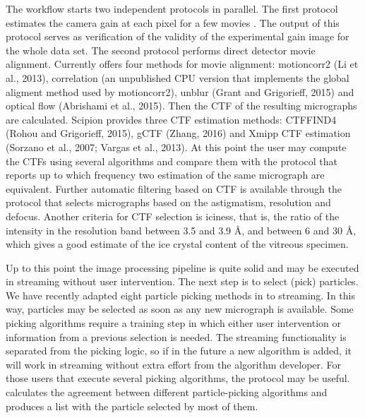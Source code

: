 The workflow starts two independent protocols in parallel. The first protocol estimates the camera gain at each pixel for a few  movies \citep{sorzano2018}. %
The output of this protocol serves as verification of the validity of the experimental gain image for the whole data set. The second protocol performs direct detector movie alignment. Currently \scipion offers  four  methods for movie alignment: motioncorr2 (Li et al., 2013), correlation (an unpublished CPU version that implements the global aligment method used by motioncorr2), unblur (Grant and Grigorieff, 2015) and optical flow (Abrishami et al., 2015). Then the CTF of the resulting micrographs are calculated. Scipion provides three CTF estimation methods:
CTFFIND4 (Rohou and Grigorieff, 2015), gCTF (Zhang, 2016) and Xmipp CTF estimation (Sorzano et al., 2007; Vargas et al., 2013). At this point the user may compute the CTFs using several algorithms and compare them with the protocol  that reports up to which frequency two estimation of the same micrograph are equivalent. Further automatic filtering based on CTF is available through the protocol  that selects micrographs based on the astigmatism, resolution and defocus. Another criteria for CTF selection is iciness, that is,  the ratio of the intensity in the resolution band between 3.5 and 3.9 \AA, and between 6 and 30 \AA, which gives a good estimate of the ice crystal content of the vitreous specimen.

Up to this point the image processing pipeline is quite solid and may be executed in streaming without user intervention. The next step is to select (pick) particles. We have recently adapted eight particle picking methods in \scipion  to streaming. In this way,  particles may be selected as soon as any new micrograph is available. Some picking algorithms require a training step in which either user intervention or information from a previous selection is needed. The streaming functionality is separated from the picking logic, so if in the future a new algorithm is added, it will work in streaming without extra effort from the algorithm developer. For those users that execute several picking algorithms, the protocol  may be useful.   calculates the agreement between different particle-picking algorithms and produces a list with the particle selected by most of them.


